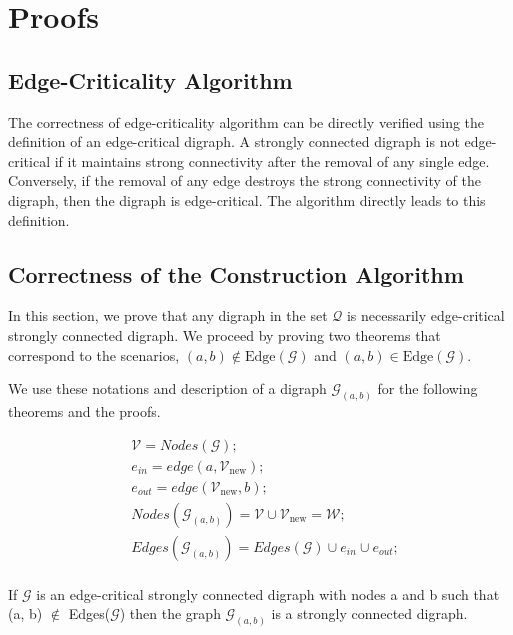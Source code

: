 \documentclass[runningheads]{llncs}
\begin{document}
\section{Proofs}

\subsection{Edge-Criticality Algorithm}
The correctness of edge-criticality algorithm can be directly verified using the definition of an edge-critical digraph. A strongly connected digraph is not edge-critical if it maintains strong connectivity after the removal of any single edge. Conversely, if the removal of any edge destroys the strong connectivity of the digraph, then the digraph is edge-critical. The algorithm directly leads to this definition.

\subsection{Correctness of the Construction Algorithm}
In this section, we prove that any digraph in the set $\mathcal{Q}$ is necessarily edge-critical strongly connected digraph. We proceed by proving two theorems that correspond to  the scenarios, $(a, b) \notin \text{Edge}(\mathcal{G})$ and $(a, b) \in \text{Edge}(\mathcal{G})$. 

\vspace{0.5em}
\noindent We use these notations and description of a digraph $\mathcal{G}_{(a,b)}$ for the following theorems and the proofs.

\begin{align*}
    &\mathcal{V} = Nodes(\mathcal{G}); \\
    &e_{in} = edge (a, \mathcal{V}_{\text{new}}); \\
    &e_{out} = edge (\mathcal{V}_{\text{new}}, b); \\
    &Nodes(\mathcal{G}_{(a,b)}) = \mathcal{V} \cup \mathcal{V}_{\text{new}} = \mathcal{W}; \\
    &Edges(\mathcal{G}_{(a,b)}) = Edges(\mathcal{G}) \cup e_{in} \cup e_{out}; \\
\end{align*}

\begin{theorem}
If $\mathcal{G}$ is an edge-critical strongly connected digraph with nodes a and b such that (a, b) $\notin$ Edges($\mathcal{G}$) then the graph $\mathcal{G}_{(a,b)}$ is a strongly connected digraph.
\end{theorem}
\end{document}
